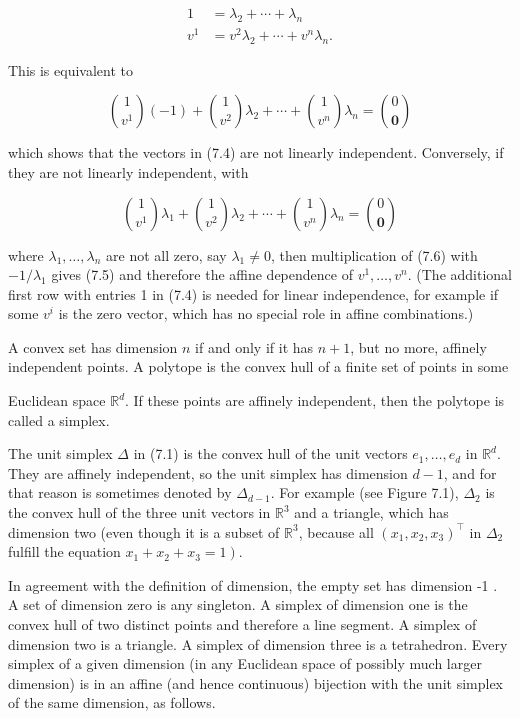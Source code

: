 \documentclass[12pt]{article}
\begin{document}
$$
\begin{aligned}
1 & =\lambda_{2}+\cdots+\lambda_{n} \\
v^{1} & =v^{2} \lambda_{2}+\cdots+v^{n} \lambda_{n} .
\end{aligned}
$$

This is equivalent to


\begin{equation*}
\binom{1}{v^{1}}(-1)+\binom{1}{v^{2}} \lambda_{2}+\cdots+\binom{1}{v^{n}} \lambda_{n}=\binom{0}{\mathbf{0}} \tag{7.5}
\end{equation*}


which shows that the vectors in (7.4) are not linearly independent. Conversely, if they are not linearly independent, with


\begin{equation*}
\binom{1}{v^{1}} \lambda_{1}+\binom{1}{v^{2}} \lambda_{2}+\cdots+\binom{1}{v^{n}} \lambda_{n}=\binom{0}{\mathbf{0}} \tag{7.6}
\end{equation*}


where $\lambda_{1}, \ldots, \lambda_{n}$ are not all zero, say $\lambda_{1} \neq 0$, then multiplication of (7.6) with $-1 / \lambda_{1}$ gives (7.5) and therefore the affine dependence of $v^{1}, \ldots, v^{n}$. (The additional first row with entries 1 in (7.4) is needed for linear independence, for example if some $v^{i}$ is the zero vector, which has no special role in affine combinations.)

A convex set has dimension $n$ if and only if it has $n+1$, but no more, affinely independent points. A polytope is the convex hull of a finite set of points in some

Euclidean space $\mathbb{R}^{d}$. If these points are affinely independent, then the polytope is called a simplex.

The unit simplex $\Delta$ in (7.1) is the convex hull of the unit vectors $e_{1}, \ldots, e_{d}$ in $\mathbb{R}^{d}$. They are affinely independent, so the unit simplex has dimension $d-1$, and for that reason is sometimes denoted by $\Delta_{d-1}$. For example (see Figure 7.1), $\Delta_{2}$ is the convex hull of the three unit vectors in $\mathbb{R}^{3}$ and a triangle, which has dimension two (even though it is a subset of $\mathbb{R}^{3}$, because all $\left(x_{1}, x_{2}, x_{3}\right)^{\top}$ in $\Delta_{2}$ fulfill the equation $\left.x_{1}+x_{2}+x_{3}=1\right)$.

In agreement with the definition of dimension, the empty set has dimension -1 . A set of dimension zero is any singleton. A simplex of dimension one is the convex hull of two distinct points and therefore a line segment. A simplex of dimension two is a triangle. A simplex of dimension three is a tetrahedron. Every simplex of a given dimension (in any Euclidean space of possibly much larger dimension) is in an affine (and hence continuous) bijection with the unit simplex of the same dimension, as follows.
\end{document}
